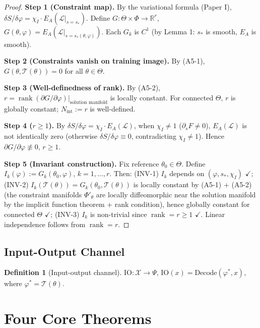 \documentclass[12pt,a4paper]{article}
\theoremstyle{definition}
\newtheorem{definition}[theorem]{Definition}
\newcommand{\mL}{\mathcal{L}}
\newcommand{\mT}{\mathcal{T}}
\newcommand{\mX}{\mathcal{X}}
\newcommand{\mPhi}{\Phi}
\newcommand{\mPsi}{\Psi}
\newcommand{\mTheta}{\Theta}
\newcommand{\R}{\mathbb{R}}
\newcommand{\chiI}{\chi_I}
\newcommand{\Nint}{N_{\mathrm{int}}}
\newcommand{\rank}{\operatorname{rank}}
\begin{document}
\begin{proof}
\textbf{Step 1 (Constraint map).} By the variational formula (Paper I), $\delta S / \delta \varphi = \chiI \cdot E_A(\mL|_{s = s_*})$. Define $G: \mTheta \times \mPhi \to \R^r$, $G(\theta, \varphi) = E_A(\mL|_{s = s_*(\theta, \varphi)})$. Each $G_k$ is $C^1$ (by Lemma 1: $s_*$ is smooth, $E_A$ is smooth).

\textbf{Step 2 (Constraints vanish on training image).} By (A5-1), $G(\theta, \mT(\theta)) = 0$ for all $\theta \in \mTheta$.

\textbf{Step 3 (Well-definedness of rank).} By (A5-2), $r = \rank(\partial G / \partial \varphi)|_{\text{solution manifold}}$ is locally constant. For connected $\mTheta$, $r$ is globally constant; $\Nint := r$ is well-defined.

\textbf{Step 4 ($r \geq 1$).} By $\delta S / \delta \varphi = \chiI \cdot E_A(\mL)$, when $\chiI \neq 1$ ($\partial_s F \neq 0$), $E_A(\mL)$ is not identically zero (otherwise $\delta S / \delta \varphi \equiv 0$, contradicting $\chiI \neq 1$). Hence $\partial G / \partial \varphi \not\equiv 0$, $r \geq 1$.

\textbf{Step 5 (Invariant construction).} Fix reference $\theta_0 \in \mTheta$. Define $I_k(\varphi) := G_k(\theta_0, \varphi)$, $k = 1, \ldots, r$. Then: (INV-1) $I_k$ depends on $(\varphi, s_*, \chiI)$ $\checkmark$; (INV-2) $I_k(\mT(\theta)) = G_k(\theta_0, \mT(\theta))$ is locally constant by (A5-1) + (A5-2) (the constraint manifolds $\Phi'_\theta$ are locally diffeomorphic near the solution manifold by the implicit function theorem + rank condition), hence globally constant for connected $\mTheta$ $\checkmark$; (INV-3) $I_k$ is non-trivial since $\rank = r \geq 1$ $\checkmark$. Linear independence follows from $\rank = r$.
\end{proof}

\subsection{Input-Output Channel}

\begin{definition}[Input-output channel]
\label{def:io}
$\mathrm{IO}: \mX \to \mPsi$, $\mathrm{IO}(x) = \mathrm{Decode}(\varphi^*, x)$, where $\varphi^* = \mT(\theta)$.
\end{definition}

\section{Four Core Theorems}
\label{sec:theorems}
\end{document}
